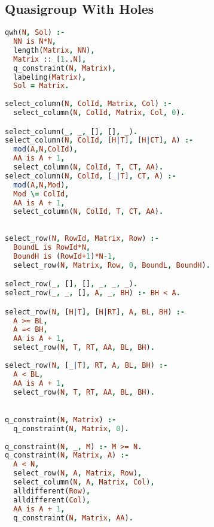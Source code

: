 \subsection{Quasigroup With Holes}
\begin{lstlisting}[language=Prolog]
qwh(N, Sol) :-
  NN is N*N,
  length(Matrix, NN),
  Matrix :: [1..N],
  q_constraint(N, Matrix),
  labeling(Matrix),
  Sol = Matrix.
  
select_column(N, ColId, Matrix, Col) :- 
  select_column(N, ColId, Matrix, Col, 0).

select_column(_, _, [], [], _).
select_column(N, ColId, [H|T], [H|CT], A) :-
  mod(A,N,ColId),
  AA is A + 1,
  select_column(N, ColId, T, CT, AA).
select_column(N, ColId, [_|T], CT, A) :-
  mod(A,N,Mod),
  Mod \= ColId,
  AA is A + 1,
  select_column(N, ColId, T, CT, AA).
  
  
select_row(N, RowId, Matrix, Row) :-  
  BoundL is RowId*N, 
  BoundH is (RowId+1)*N-1, 
  select_row(N, Matrix, Row, 0, BoundL, BoundH).

select_row(_, [], [], _, _, _).
select_row(_, _, [], A, _, BH) :- BH < A.

select_row(N, [H|T], [H|RT], A, BL, BH) :-
  A >= BL,
  A =< BH,
  AA is A + 1,
  select_row(N, T, RT, AA, BL, BH).
  
select_row(N, [_|T], RT, A, BL, BH) :-
  A < BL,
  AA is A + 1,
  select_row(N, T, RT, AA, BL, BH).
  

q_constraint(N, Matrix) :-
  q_constraint(N, Matrix, 0).
  
q_constraint(N, _, M) :- M >= N.
q_constraint(N, Matrix, A) :- 
  A < N,
  select_row(N, A, Matrix, Row),
  select_column(N, A, Matrix, Col),
  alldifferent(Row),
  alldifferent(Col),
  AA is A + 1,
  q_constraint(N, Matrix, AA).
\end{lstlisting}

